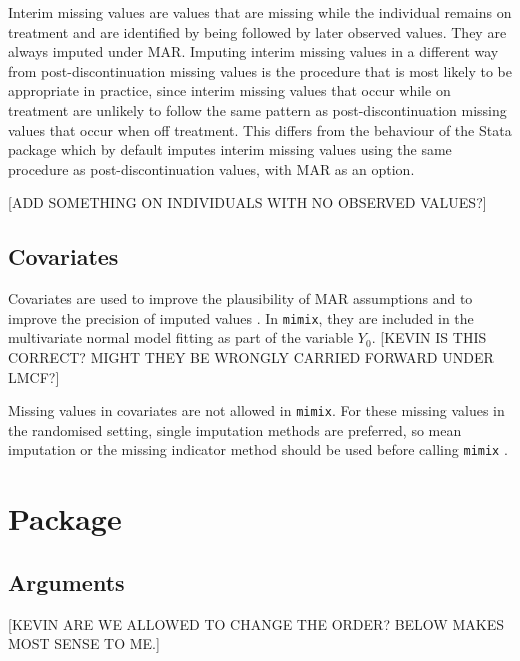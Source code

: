 Interim missing values are values that are missing while the individual remains on treatment and are identified by being followed by later observed values. They are always imputed under MAR. Imputing interim missing values in a different way from post-discontinuation missing values is the procedure that is most likely to be appropriate in practice, since interim missing values that occur while on treatment are unlikely to follow the same pattern as post-discontinuation missing values that occur when off treatment. This differs from the behaviour of the Stata package \citep{Cro++16} which by default imputes interim missing values using the same procedure as post-discontinuation values, with MAR as an option.

[ADD SOMETHING ON INDIVIDUALS WITH NO OBSERVED VALUES?]

\subsection{Covariates}

Covariates are used to improve the plausibility of MAR assumptions and to improve the precision of imputed values \citep{ian:MItutorial}. 
In \texttt{mimix}, they are included in the multivariate normal model fitting as part of the variable $Y_0$. [KEVIN IS THIS CORRECT? MIGHT THEY BE WRONGLY CARRIED FORWARD UNDER LMCF?]

Missing values in covariates are not allowed in \texttt{mimix}. For these missing values in the randomised setting, single imputation methods are preferred, so mean imputation or the missing indicator method should be used before calling \texttt{mimix} \citep{ian:MIinRCTs}.


\section{Package}

\subsection{Arguments} [KEVIN ARE WE ALLOWED TO CHANGE THE ORDER? BELOW MAKES MOST SENSE TO ME.]

